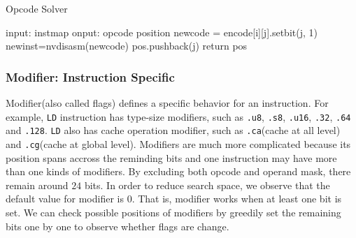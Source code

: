 \begin{algorithm}
      \caption{Opcode Solver}\label{algo:opcode}
  \begin{algorithmic}[1]
      \State input: instmap
      \State onput: opcode position
      \State newcode = encode[i][j].setbit(j, 1)
      \State newinst=nvdisasm(newcode)
      \State pos.pushback(j)
      \EndIf
      \EndIf
      \EndFor
      \EndFor
      \State return pos
  \end{algorithmic}
\end{algorithm}

\subsubsection{Modifier: Instruction Specific}

Modifier(also called flags) defines a specific behavior for an instruction. For example,
{\tt LD} instruction has type-size modifiers, such as {\tt .u8}, {\tt .s8}, {\tt .u16}, {\tt .32}, {\tt .64} and {\tt .128}. {\tt LD} also has cache operation modifier, such as {\tt .ca}(cache at all level) and {\tt .cg}(cache at global level). Modifiers are much more complicated because its position spans accross the reminding bits and one instruction may have more than one kinds of modifiers. By excluding both opcode and operand mask, there remain around $24$ bits. In order to reduce search space, we observe that the default value for modifier is $0$. That is, modifier works when at least one bit is set. We can check possible positions of modifiers by greedily set the remaining bits one by one to observe whether flags are change.



